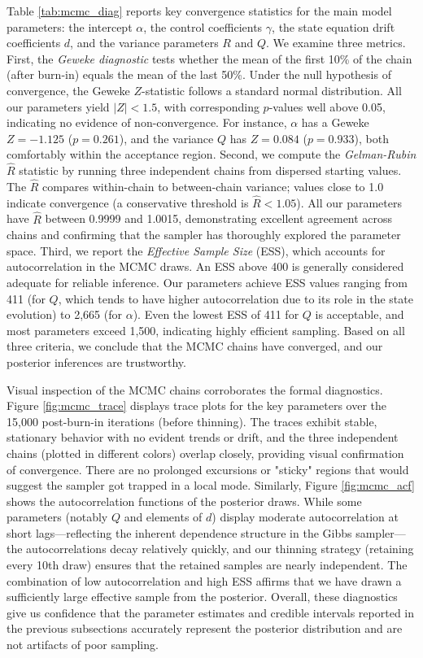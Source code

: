 \documentclass[12pt]{article}
\begin{document}
Table \ref{tab:mcmc_diag} reports key convergence statistics for the main model parameters: the intercept $\alpha$, the control coefficients $\gamma$, the state equation drift coefficients $d$, and the variance parameters $R$ and $Q$. We examine three metrics. First, the \textit{Geweke diagnostic} tests whether the mean of the first 10\% of the chain (after burn-in) equals the mean of the last 50\%. Under the null hypothesis of convergence, the Geweke $Z$-statistic follows a standard normal distribution. All our parameters yield $|Z| < 1.5$, with corresponding $p$-values well above 0.05, indicating no evidence of non-convergence. For instance, $\alpha$ has a Geweke $Z = -1.125$ ($p=0.261$), and the variance $Q$ has $Z=0.084$ ($p=0.933$), both comfortably within the acceptance region. Second, we compute the \textit{Gelman-Rubin} $\hat{R}$ statistic by running three independent chains from dispersed starting values. The $\hat{R}$ compares within-chain to between-chain variance; values close to 1.0 indicate convergence (a conservative threshold is $\hat{R} < 1.05$). All our parameters have $\hat{R}$ between 0.9999 and 1.0015, demonstrating excellent agreement across chains and confirming that the sampler has thoroughly explored the parameter space. Third, we report the \textit{Effective Sample Size} (ESS), which accounts for autocorrelation in the MCMC draws. An ESS above 400 is generally considered adequate for reliable inference. Our parameters achieve ESS values ranging from 411 (for $Q$, which tends to have higher autocorrelation due to its role in the state evolution) to 2,665 (for $\alpha$). Even the lowest ESS of 411 for $Q$ is acceptable, and most parameters exceed 1,500, indicating highly efficient sampling. Based on all three criteria, we conclude that the MCMC chains have converged, and our posterior inferences are trustworthy.

Visual inspection of the MCMC chains corroborates the formal diagnostics. Figure \ref{fig:mcmc_trace} displays trace plots for the key parameters over the 15,000 post-burn-in iterations (before thinning). The traces exhibit stable, stationary behavior with no evident trends or drift, and the three independent chains (plotted in different colors) overlap closely, providing visual confirmation of convergence. There are no prolonged excursions or "sticky" regions that would suggest the sampler got trapped in a local mode. Similarly, Figure \ref{fig:mcmc_acf} shows the autocorrelation functions of the posterior draws. While some parameters (notably $Q$ and elements of $d$) display moderate autocorrelation at short lags—reflecting the inherent dependence structure in the Gibbs sampler—the autocorrelations decay relatively quickly, and our thinning strategy (retaining every 10th draw) ensures that the retained samples are nearly independent. The combination of low autocorrelation and high ESS affirms that we have drawn a sufficiently large effective sample from the posterior. Overall, these diagnostics give us confidence that the parameter estimates and credible intervals reported in the previous subsections accurately represent the posterior distribution and are not artifacts of poor sampling.
\end{document}
